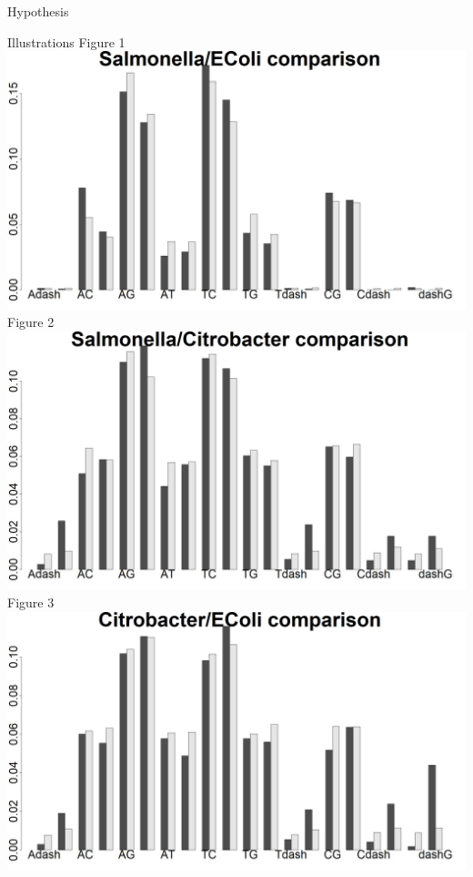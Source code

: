 \documentclass[final]{beamer}
\begin{document}
\begin{frame}{}
\begin{columns}[t]
\begin{column}{.32 \linewidth}
\begin{block}{\large Hypothesis}
\end{block}
\begin{block}{\large Illustrations}
Figure 1
	\includegraphics[scale = .455]{SalECPercentage.jpeg}
	\newline
Figure 2
 \includegraphics[scale = .455]{CBSalPercentage.jpeg}
 \newline
Figure 3
 \includegraphics[scale = .455]{CBECPercentage.jpeg}



\end{block}
\end{column}
\end{columns}
\end{frame}
\end{document}
